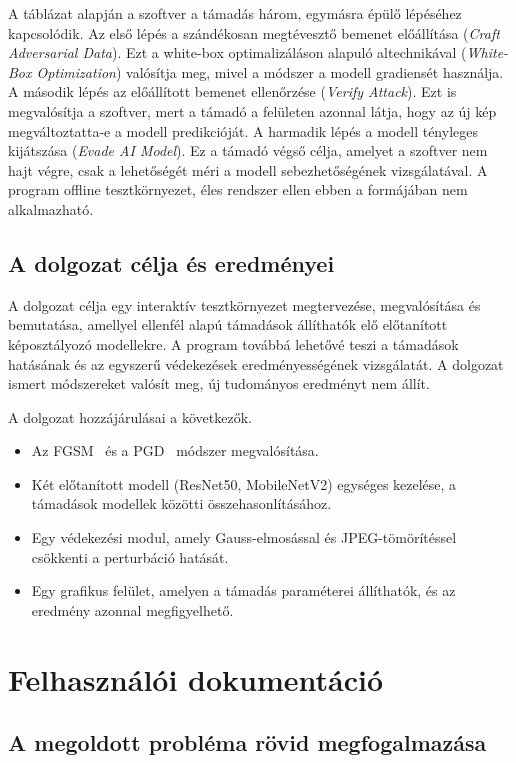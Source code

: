 A táblázat alapján a szoftver a támadás három, egymásra épülő lépéséhez kapcsolódik. 
Az első lépés a szándékosan megtévesztő bemenet előállítása (\textit{Craft Adversarial Data}). 
Ezt a white-box optimalizáláson alapuló altechnikával (\textit{White-Box Optimization}) valósítja meg, mivel a módszer a modell 
gradiensét használja. 
A második lépés az előállított bemenet ellenőrzése (\textit{Verify Attack}). 
Ezt is megvalósítja a szoftver, mert a támadó a felületen azonnal látja, hogy az új kép megváltoztatta-e a modell predikcióját. 
A harmadik lépés a modell tényleges kijátszása (\textit{Evade AI Model}). 
Ez a támadó végső célja, amelyet a szoftver nem hajt végre, csak a lehetőségét méri a modell sebezhetőségének vizsgálatával. 
A program offline tesztkörnyezet, éles rendszer ellen ebben a formájában nem alkalmazható. 

\section{A dolgozat célja és eredményei}
A dolgozat célja egy interaktív tesztkörnyezet megtervezése, megvalósítása és bemutatása, amellyel ellenfél alapú támadások 
állíthatók elő előtanított képosztályozó modellekre. 
A program továbbá lehetővé teszi a támadások hatásának és az egyszerű védekezések eredményességének vizsgálatát. 
A dolgozat ismert módszereket valósít meg, új tudományos eredményt nem állít. 

A dolgozat hozzájárulásai a következők. 
\begin{itemize}
  \item Az FGSM~\cite{goodfellow2015explaining} és a PGD~\cite{madry2018towards} módszer megvalósítása. 
  \item Két előtanított modell (ResNet50, MobileNetV2) egységes kezelése, a támadások modellek közötti összehasonlításához. 
  \item Egy védekezési modul, amely Gauss-elmosással és JPEG-tömörítéssel csökkenti a perturbáció hatását. 
  \item Egy grafikus felület, amelyen a támadás paraméterei állíthatók, és az eredmény azonnal megfigyelhető. 
\end{itemize}

\chapter{Felhasználói dokumentáció}

\section{A megoldott probléma rövid megfogalmazása}

